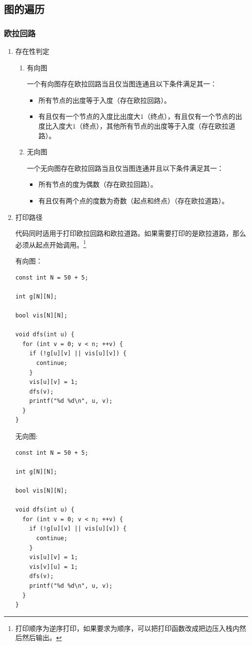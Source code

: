 \documentclass[11pt]{article}
\begin{document}
\subsection{图的遍历}
\label{sec:org8515d23}
\subsubsection{欧拉回路}
\label{sec:org649b033}
\begin{enumerate}
\item 存在性判定
\label{sec:org7698a0d}
\begin{enumerate}
\item 有向图
\label{sec:org13269ee}

一个有向图存在欧拉回路当且仅当图连通且以下条件满足其一：

\begin{itemize}
\item 所有节点的出度等于入度（存在欧拉回路）。
\item 有且仅有一个节点的入度比出度大\(1\)（终点），有且仅有一个节点的出度比入度大\(1\)（终点），其他所有节点的出度等于入度（存在欧拉道路）。
\end{itemize}

\item 无向图
\label{sec:orgfd5fd1e}

一个无向图存在欧拉回路当且仅当图连通并且以下条件满足其一：

\begin{itemize}
\item 所有节点的度为偶数（存在欧拉回路）。
\item 有且仅有两个点的度数为奇数（起点和终点）（存在欧拉道路）。
\end{itemize}
\end{enumerate}
\item 打印路径
\label{sec:org405f960}

代码同时适用于打印欧拉回路和欧拉道路。如果需要打印的是欧拉道路，那么必须从起点开始调用。\footnote{打印顺序为逆序打印，如果要求为顺序，可以把打印函数改成把边压入栈内然后然后输出。}

有向图：

\begin{verbatim}
const int N = 50 + 5;

int g[N][N];

bool vis[N][N];

void dfs(int u) {
  for (int v = 0; v < n; ++v) {
    if (!g[u][v] || vis[u][v]) {
      continue;
    }
    vis[u][v] = 1;
    dfs(v);
    printf("%d %d\n", u, v);
  }
}
\end{verbatim}

无向图:

\begin{verbatim}
const int N = 50 + 5;

int g[N][N];

bool vis[N][N];

void dfs(int u) {
  for (int v = 0; v < n; ++v) {
    if (!g[u][v] || vis[u][v]) {
      continue;
    }
    vis[u][v] = 1;
    vis[v][u] = 1;
    dfs(v);
    printf("%d %d\n", u, v);
  }
}
\end{verbatim}
\end{enumerate}
\end{document}
